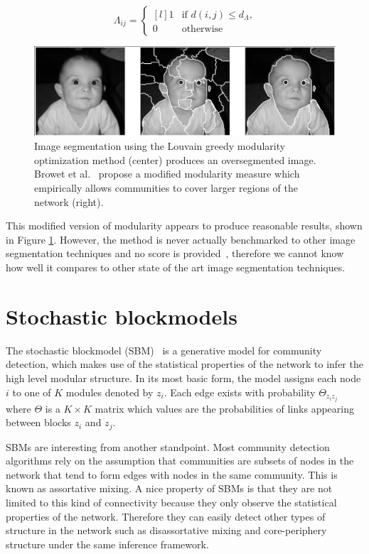 \documentclass[conference]{IEEEtran}
\begin{document}
\begin{equation}
    \Lambda_{ij} = \left \{ \begin{matrix*}[l]
    1 & \text{if } d(i, j) \leq d_{\Lambda}\text{,} \\
    0 & \text{otherwise}
    \end{matrix*}\right.
\end{equation}

\begin{figure}[ht]
    \centering
    \includegraphics[width=\linewidth]{images/modularity_baby.png}
    \caption{Image segmentation using the Louvain greedy modularity optimization method (center) produces an oversegmented image. Browet et al.~\cite{browet2011community} propose a modified modularity measure which empirically allows communities to cover larger regions of the network (right).}
    \label{fig:modularity_baby}
\end{figure}

This modified version of modularity appears to produce reasonable results, shown in Figure \ref{fig:modularity_baby}. However, the method is never actually benchmarked to other image segmentation techniques and no score is provided~\cite{browet2011community}, therefore we cannot know how well it compares to other state of the art image segmentation techniques.

\section{Stochastic blockmodels}\label{sbm}
The stochastic blockmodel (SBM)~\cite{holland1983stochastic} is a generative model for community detection, which makes use of the statistical properties of the network to infer the high level modular structure. In its most basic form, the model assigns each node $i$ to one of $K$ modules denoted by $z_i$. Each edge exists with probability $\Theta_{z_i z_j}$ where $\Theta$ is a $K \times K$ matrix which values are the probabilities of links appearing between blocks $z_i$ and $z_j$.

SBMs are interesting from another standpoint. Most community detection algorithms rely on the assumption that communities are subsets of nodes in the network that tend to form edges with nodes in the same community. This is known as assortative mixing. A nice property of SBMs is that they are not limited to this kind of connectivity because they only observe the statistical properties of the network. Therefore they can easily detect other types of structure in the network such as disassortative mixing and core-periphery structure under the same inference framework.
\end{document}
